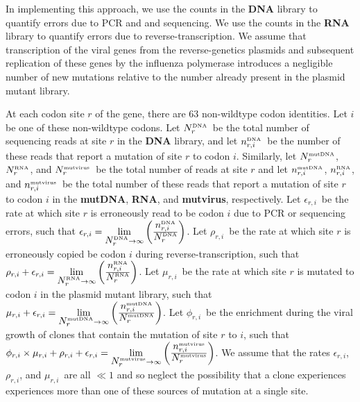 \documentclass[10pt]{article}
\newcommand{\Nrdna}{\mbox{$N_r^{\rm \scriptscriptstyle DNA}$}}
\newcommand{\Nrmutdna}{\mbox{$N_r^{\rm \scriptscriptstyle mut DNA}$}}
\newcommand{\Nrrna}{\mbox{$N_r^{\rm \scriptscriptstyle RNA}$}}
\newcommand{\Nrmutvirus}{\mbox{$N_r^{\rm \scriptscriptstyle mut virus}$}}
\newcommand{\nrdnai}{\mbox{$n_{r, i}^{\rm \scriptscriptstyle DNA}$}}
\newcommand{\nrmutdnai}{\mbox{$n_{r, i}^{\rm \scriptscriptstyle mut DNA}$}}
\newcommand{\nrrnai}{\mbox{$n_{r, i}^{\rm \scriptscriptstyle  RNA}$}}
\newcommand{\nrmutvirusi}{\mbox{$n_{r, i}^{\rm \scriptscriptstyle mut virus}$}}
\newcommand{\eri}{\mbox{$\epsilon_{r,i}$}}
\newcommand{\sri}{\mbox{$\phi_{r,i}$}}
\newcommand{\rri}{\mbox{$\rho_{r,i}$}}
\newcommand{\mri}{\mbox{$\mu_{r,i}$}}
\begin{document}
In implementing this approach, we use the counts in the {\bf DNA} library to quantify errors due to PCR and and sequencing. We use the counts in the {\bf RNA} library to quantify errors due to reverse-transcription. We assume that transcription of the viral genes from the reverse-genetics plasmids and subsequent replication of these genes by the influenza polymerase introduces a negligible number of new mutations relative to the number already present in the plasmid mutant library. 

At each codon site $r$ of the gene, there are 63 non-wildtype codon identities. Let $i$ be one of these non-wildtype codons. Let \Nrdna\ be the total number of sequencing reads at site $r$ in the {\bf DNA} library, and let \nrdnai\ be the number of these reads that report a mutation of site $r$ to codon $i$. Similarly, let \Nrmutdna, \Nrrna, and \Nrmutvirus\ be the total number of reads at site $r$ and let \nrmutdnai, \nrrnai, and \nrmutvirusi\ be the total number of these reads that report a mutation of site $r$ to codon $i$ in the {\bf mutDNA}, {\bf RNA}, and {\bf mutvirus}, respectively. Let \eri\ be the rate at which site $r$ is erroneously read to be codon $i$ due to PCR or sequencing errors, such that $\eri = \lim\limits_{\Nrdna \rightarrow \infty} \left(\frac{\nrdnai}{\Nrdna}\right)$. Let \rri\ be the rate at which site $r$ is erroneously copied be codon $i$ during reverse-transcription, such that $\rri + \eri = \lim\limits_{\Nrrna \rightarrow \infty}\left(\frac{\nrrnai}{\Nrrna}\right)$. Let \mri\ be the rate at which site $r$ is mutated to codon $i$ in the plasmid mutant library, such that $\mri + \eri = \lim\limits_{\Nrmutdna \rightarrow \infty}\left(\frac{\nrmutdnai}{\Nrmutdna}\right)$. Let \sri\ be the enrichment during the viral growth of clones that contain the mutation of site $r$ to $i$, such that $\sri \times \mri + \rri + \eri = \lim\limits_{\Nrmutvirus \rightarrow \infty}\left(\frac{\nrmutvirusi}{\Nrmutvirus}\right)$. We assume that the rates \eri, \rri, and \mri\ are all $\ll 1$ and so neglect the possibility that a clone experiences experiences more than one of these sources of mutation at a single site. 
\end{document}

